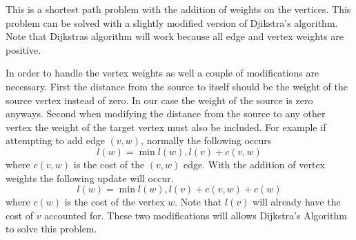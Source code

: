\documentclass[11pt, oneside]{article}
\begin{document}
\begin{enumerate}
    This is a shortest path problem with the addition of weights on the
    vertices.
    This problem can be solved with a slightly modified version of Djikstra's
    algorithm.
    Note that Dijkstras algorithm will work because all edge and vertex weights
    are positive.

    In order to handle the vertex weights as well a couple of modifications are
    necessary.
    First the distance from the source to itself should be the weight of the source
    vertex instead of zero.
    In our case the weight of the source is zero anyways.
    Second when modifying the distance from the source to any other vertex the
    weight of the target vertex must also be included.
    For example if attempting to add edge $(v, w)$, normally the following
    occurs
    \[
      l(w) = \min{l(w), l(v) + c(v, w)}
    \]
    where $c(v, w)$ is the cost of the $(v, w)$ edge.
    With the addition of vertex weights the following update will occur.
    \[
      l(w) = \min{l(w), l(v) + c(v, w) + c(w)}
    \]
    where $c(w)$ is the cost of the vertex $w$.
    Note that $l(v)$ will already have the cost of $v$ accounted for.
    These two modifications will allows Dijkstra's Algorithm to solve this
    problem.


\end{enumerate}
\end{document}

